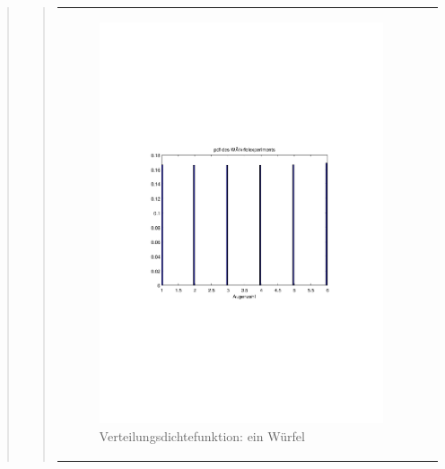 \begin{quote}
\begin{quote}
\begin{center}
\begin{tabular}{ll}
\begin{minipage}{0.6\textwidth}
                \begin{figure}[H]
                    \label{fig:funktion0alpha}
                    \includegraphics[scale=0.7, trim = 20mm 80mm 20mm 90mm, clip]{Bilder/fairer_wuerfel}
                    \caption{Verteilungsdichtefunktion: ein Würfel}
                \end{figure}
        
            \end{minipage}
        

\end{tabular}
\end{center}
\end{quote}
\end{quote}
